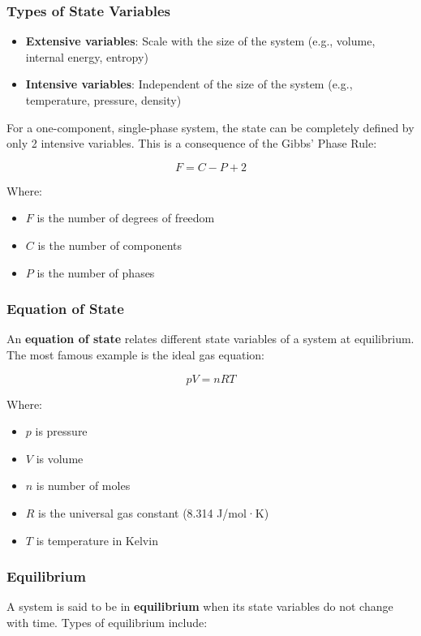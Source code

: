 \documentclass{article}
\theoremstyle{definition}
\begin{document}
\subsubsection{Types of State Variables}
\begin{itemize}
    \item \textbf{Extensive variables}: Scale with the size of the system (e.g., volume, internal energy, entropy)
    \item \textbf{Intensive variables}: Independent of the size of the system (e.g., temperature, pressure, density)
\end{itemize}

For a one-component, single-phase system, the state can be completely defined by only 2 intensive variables. This is a consequence of the Gibbs' Phase Rule:

\[
F = C - P + 2
\]

Where:
\begin{itemize}
    \item $F$ is the number of degrees of freedom
    \item $C$ is the number of components
    \item $P$ is the number of phases
\end{itemize}

\subsubsection{Equation of State}
An \textbf{equation of state} relates different state variables of a system at equilibrium. The most famous example is the ideal gas equation:

\[
pV = nRT
\]

Where:
\begin{itemize}
    \item $p$ is pressure
    \item $V$ is volume
    \item $n$ is number of moles
    \item $R$ is the universal gas constant (8.314 J/mol·K)
    \item $T$ is temperature in Kelvin
\end{itemize}

\subsubsection{Equilibrium}
A system is said to be in \textbf{equilibrium} when its state variables do not change with time. Types of equilibrium include:
\end{document}
